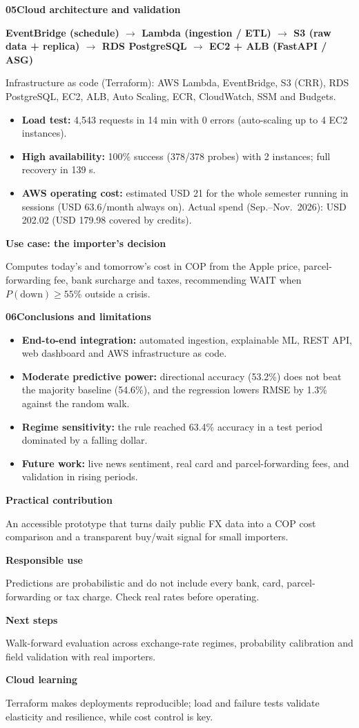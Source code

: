 \documentclass{article}
\newcommand{\sect}[2]{%
  \par\vspace{0.7em}%
  {\fontsize{32}{38}\selectfont\bfseries\color{teal}#1\hspace{0.4em}\color{navy}#2\par}%
  \vspace{0.15em}{\color{amber}\rule{\linewidth}{3pt}}\par\vspace{0.3em}}
\newcommand{\note}[2]{%
  \begin{tcolorbox}[enhanced,colback=white,colframe=teal,arc=3mm,boxrule=1.2pt,left=4mm,right=4mm,top=3mm,bottom=3mm]
  {\bfseries\color{navy}#1\par}\vspace{0.2em}#2
  \end{tcolorbox}}
\begin{document}
\begin{minipage}[t]{546mm}
\begin{minipage}[t]{174mm}
\sect{05}{Cloud architecture and validation}
{\centering\fontsize{19}{24}\selectfont\bfseries\color{navy}
EventBridge (schedule) $\rightarrow$ Lambda (ingestion / ETL) $\rightarrow$ S3 (raw data + replica) $\rightarrow$ RDS PostgreSQL $\rightarrow$ EC2 + ALB (FastAPI / ASG)\par}

Infrastructure as code (Terraform): AWS Lambda, EventBridge, S3 (CRR), RDS PostgreSQL, EC2, ALB, Auto Scaling, ECR, CloudWatch, SSM and Budgets.
\begin{itemize}
  \item \textbf{Load test:} 4,543 requests in 14 min with 0 errors (auto-scaling up to 4 EC2 instances).
  \item \textbf{High availability:} 100\% success (378/378 probes) with 2 instances; full recovery in 139 s.
  \item \textbf{AWS operating cost:} estimated USD 21 for the whole semester running in sessions (USD 63.6/month always on). Actual spend (Sep.--Nov.\ 2026): USD 202.02 (USD 179.98 covered by credits).
\end{itemize}

\note{Use case: the importer's decision}{%
Computes today's and tomorrow's cost in COP from the Apple price, parcel-forwarding fee, bank surcharge and taxes, recommending WAIT when $P(\text{down})\geq 55\%$ outside a crisis.}

\sect{06}{Conclusions and limitations}
\begin{itemize}
  \item \textbf{End-to-end integration:} automated ingestion, explainable ML, REST API, web dashboard and AWS infrastructure as code.
  \item \textbf{Moderate predictive power:} directional accuracy (53.2\%) does not beat the majority baseline (54.6\%), and the regression lowers RMSE by 1.3\% against the random walk.
  \item \textbf{Regime sensitivity:} the rule reached 63.4\% accuracy in a test period dominated by a falling dollar.
  \item \textbf{Future work:} live news sentiment, real card and parcel-forwarding fees, and validation in rising periods.
\end{itemize}

\note{Practical contribution}{An accessible prototype that turns daily public FX data into a COP cost comparison and a transparent buy/wait signal for small importers.}
\note{Responsible use}{Predictions are probabilistic and do not include every bank, card, parcel-forwarding or tax charge. Check real rates before operating.}
\note{Next steps}{Walk-forward evaluation across exchange-rate regimes, probability calibration and field validation with real importers.}
\note{Cloud learning}{Terraform makes deployments reproducible; load and failure tests validate elasticity and resilience, while cost control is key.}
\end{minipage}
\end{minipage}
\end{document}
